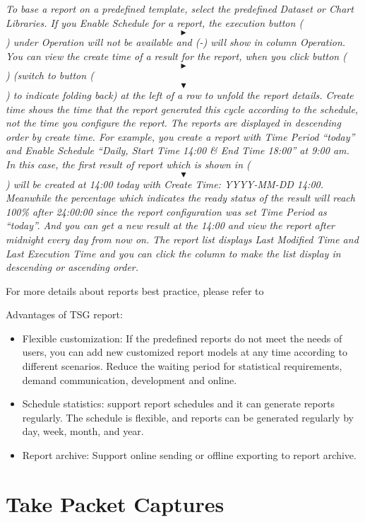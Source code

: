 \notemark\textit{To base a report on a predefined template, select the predefined Dataset or Chart Libraries.
If you Enable Schedule for a report, the execution button (\[\blacktriangleright\]) under Operation will not be available and (-) will show in column Operation. 
You can view the create time of a result for the report, when you click button (\[\blacktriangleright\]) 
(switch to button (\[\blacktriangledown\]) to indicate folding back) at the left of a row to unfold the report details. 
Create time shows the time that the report generated this cycle according to the schedule, not the time you configure the report. 
The reports are displayed in descending order by create time. For example, you create a report with Time Period “today” 
and Enable Schedule “Daily, Start Time 14:00 \& End Time 18:00” at 9:00 am. In this case, the first result of report 
which is shown in (\[\blacktriangledown\]) will be created at 14:00 today with Create Time: YYYY-MM-DD 14:00. 
Meanwhile the percentage which indicates the ready status of the result will reach 100\% after 24:00:00 since the report configuration was set Time Period as “today”. 
And you can get a new result at the 14:00 and view the report after midnight every day from now on. 
The report list displays Last Modified Time and Last Execution Time and you can click the column to make the list display in descending or ascending order.} 


For more details about reports best practice, please refer to \hyperlink{link:Make Your Own Reports}{\color{linkblue}{Appendix F Make Your Own Reports}}


Advantages of TSG report: 
\begin{itemize}
    \item Flexible customization: If the predefined reports do not meet the needs of users, you can add new customized report models at any time according to different scenarios. Reduce the waiting period for statistical requirements, demand communication, development and online. 
    \item Schedule statistics: support report schedules and it can generate reports regularly. The schedule is flexible, and reports can be generated regularly by day, week, month, and year.
    \item Report archive: Support online sending or offline exporting to report archive.
\end{itemize}

\section*{\hypertarget{link:Take Packet Captures}{Take Packet Captures}}
\label{sec:monitor:packet}

